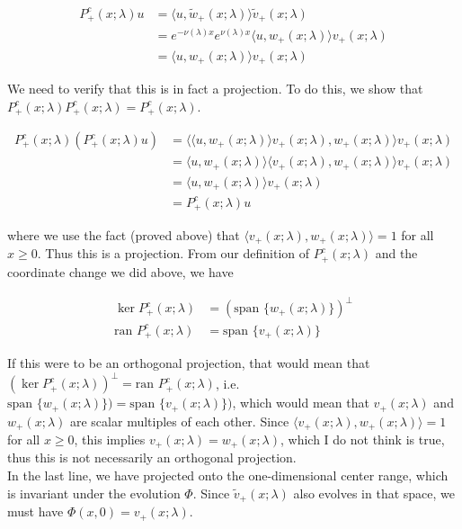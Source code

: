 \documentclass[12pt]{article}
\begin{document}
\begin{align*}
P^c_+(x; \lambda)u &= \langle u, \tilde{w}_+(x; \lambda) \rangle \tilde{v}_+(x; \lambda) \\
&= e^{-\nu(\lambda)x} e^{\nu(\lambda) x }\langle u, w_+(x; \lambda) \rangle v_+(x; \lambda) \\
&= \langle u, w_+(x; \lambda) \rangle v_+(x; \lambda)
\end{align*}

We need to verify that this is in fact a projection. To do this, we show that $P^c_+(x; \lambda)P^c_+(x; \lambda) = P^c_+(x; \lambda)$.

\begin{align*}
P^c_+(x; \lambda)( P^c_+(x; \lambda) u ) &= \langle \langle u, w_+(x; \lambda) \rangle v_+(x; \lambda), w_+(x; \lambda) \rangle v_+(x; \lambda) \\
&= \langle u, w_+(x; \lambda) \rangle \langle v_+(x; \lambda), w_+(x; \lambda) \rangle v_+(x; \lambda) \\
&= \langle u, w_+(x; \lambda) \rangle v_+(x; \lambda) \\
&= P^c_+(x; \lambda) u 
\end{align*}

where we use the fact (proved above) that $\langle v_+(x; \lambda), w_+(x; \lambda) \rangle = 1$ for all $x \geq 0$. Thus this is a projection. From our definition of $P^c_+(x; \lambda)$ and the coordinate change we did above, we have

\begin{align*}
\ker P^c_+(x; \lambda) &= ( \text{span }\{ w_+(x; \lambda) \})^\perp\\
\text{ran } P^c_+(x; \lambda) &= \text{span }\{ v_+(x; \lambda) \}
\end{align*}

If this were to be an orthogonal projection, that would mean that $(\ker P^c_+(x; \lambda))^
\perp = \text{ran } P^c_+(x; \lambda)$, i.e. $\text{span }\{ w_+(x; \lambda) \}) = \text{span }\{ v_+(x; \lambda) \})$, which would mean that $v_+(x; \lambda)$ and $w_+(x; \lambda)$ are scalar multiples of each other. Since $\langle v_+(x; \lambda), w_+(x; \lambda) \rangle = 1$ for all $x \geq 0$, this implies $v_+(x; \lambda) = w_+(x; \lambda)$, which I do not think is true, thus this is not necessarily an orthogonal projection.\\

In the last line, we have projected onto the one-dimensional center range, which is invariant under the evolution $\Phi$. Since $\tilde{v}_+(x; \lambda)$ also evolves in that space, we must have $\Phi(x,0) = v_+(x; \lambda)$.\\
\end{document}
